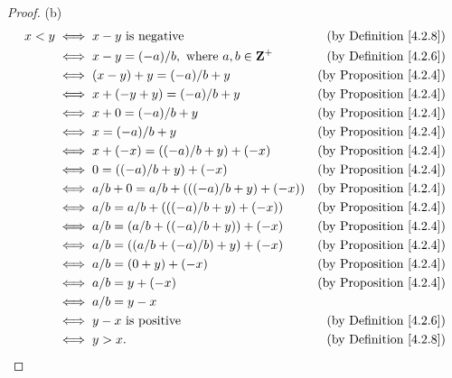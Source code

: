 \begin{proof}{(b)}
    \begin{align*}
        x < y & \iff x - y \text{ is negative}                              & \text{(by Definition \ref{4.2.8})}  \\
              & \iff x - y = (-a) / b, \text{ where } a, b \in \mathbf{Z}^+ & \text{(by Definition \ref{4.2.6})}  \\
              & \iff (x - y) + y = (-a) / b + y                             & \text{(by Proposition \ref{4.2.4})} \\
              & \iff x + (-y + y) = (-a) / b + y                            & \text{(by Proposition \ref{4.2.4})} \\
              & \iff x + 0 = (-a) / b + y                                   & \text{(by Proposition \ref{4.2.4})} \\
              & \iff x = (-a) / b + y                                       & \text{(by Proposition \ref{4.2.4})} \\
              & \iff x + (-x) = ((-a) / b + y) + (-x)                       & \text{(by Proposition \ref{4.2.4})} \\
              & \iff 0 = ((-a) / b + y) + (-x)                              & \text{(by Proposition \ref{4.2.4})} \\
              & \iff a / b + 0 = a / b + (((-a) / b + y) + (-x))            & \text{(by Proposition \ref{4.2.4})} \\
              & \iff a / b = a / b + (((-a) / b + y) + (-x))                & \text{(by Proposition \ref{4.2.4})} \\
              & \iff a / b = (a / b + ((-a) / b + y)) + (-x)                & \text{(by Proposition \ref{4.2.4})} \\
              & \iff a / b = ((a / b + (-a) / b) + y) + (-x)                & \text{(by Proposition \ref{4.2.4})} \\
              & \iff a / b = (0 + y) + (-x)                                 & \text{(by Proposition \ref{4.2.4})} \\
              & \iff a / b = y + (-x)                                       & \text{(by Proposition \ref{4.2.4})} \\
              & \iff a / b = y - x                                                                                \\
              & \iff y - x \text{ is positive}                              & \text{(by Definition \ref{4.2.6})}  \\
              & \iff y > x.                                                 & \text{(by Definition \ref{4.2.8})}
    \end{align*}
\end{proof}

